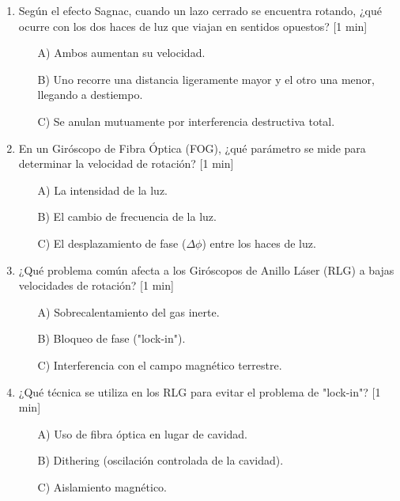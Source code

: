 \begin{enumerate}
\item Según el efecto Sagnac, cuando un lazo cerrado se encuentra rotando, ¿qué ocurre con los dos haces de luz que viajan en sentidos opuestos? [1 min]

	\begin{itemize}
		\item[A)] Ambos aumentan su velocidad.
		\item[B)] Uno recorre una distancia ligeramente mayor y el otro una menor, llegando a destiempo.
		\item[C)] Se anulan mutuamente por interferencia destructiva total.\\
	\end{itemize}

\item En un Giróscopo de Fibra Óptica (FOG), ¿qué parámetro se mide para determinar la velocidad de rotación? [1 min]

	\begin{itemize}
		\item[A)] La intensidad de la luz.
		\item[B)] El cambio de frecuencia de la luz.
		\item[C)] El desplazamiento de fase (\(\Delta \phi\)) entre los haces de luz.\\
	\end{itemize}

\item ¿Qué problema común afecta a los Giróscopos de Anillo Láser (RLG) a bajas velocidades de rotación? [1 min]

	\begin{itemize}
		\item[A)] Sobrecalentamiento del gas inerte.	
		\item[B)] Bloqueo de fase ("lock-in").
		\item[C)] Interferencia con el campo magnético terrestre.\\
	\end{itemize}

\item ¿Qué técnica se utiliza en los RLG para evitar el problema de "lock-in"? [1 min]

	\begin{itemize}
		\item[A)] Uso de fibra óptica en lugar de cavidad.	
		\item[B)] Dithering (oscilación controlada de la cavidad).
		\item[C)] Aislamiento magnético.\\
	\end{itemize}


\end{enumerate}
